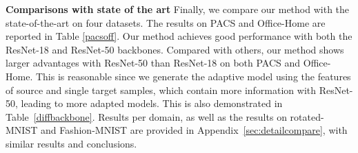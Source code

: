 \documentclass{article} \usepackage[table]{xcolor}
\begin{document}
\begin{table}[t]
\begin{center}
\caption{\textbf{Comparison on PACS and Office-Home.} Our method achieves best mean accuracy with a ResNet-50 backbone and is competitive with ResNet-18. 
Notably, it surpasses the adaptive methods by \cite{wang2021tent} and \cite{dubey2021adaptive}, despite them using more data at test-time (Table \ref{settings}). 
}
\label{pacsoff}
\vspace{-2mm}
\end{center}
\vspace{-6mm}
\end{table}





\textbf{Comparisons with state of the art} Finally, we compare our method with the state-of-the-art on four datasets. The results on PACS and Office-Home are reported in Table \ref{pacsoff}. Our method achieves good performance with both the ResNet-18 and ResNet-50 backbones. Compared with others, our method shows larger advantages with ResNet-50 than ResNet-18 on both PACS and Office-Home.
This is reasonable since we generate the adaptive model using the features of source and single target samples, which contain more information with ResNet-50, leading to more adapted models.
This is also demonstrated in Table~\ref{diffbackbone}.
Results per domain, as well as the results on rotated-MNIST and Fashion-MNIST are provided in Appendix~\ref{sec:detailcompare}, with similar results and conclusions.
\end{document}
